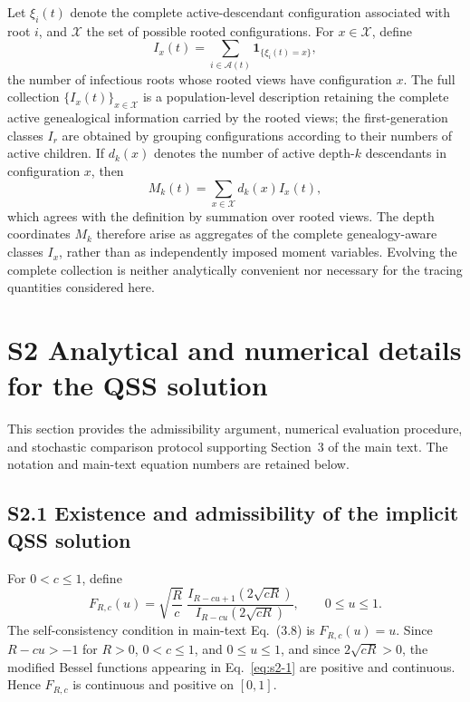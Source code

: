 \documentclass[11pt]{article}
\begin{document}
Let $\xi_i(t)$ denote the complete active-descendant configuration associated with root $i$, and $\mathcal X$ the set of possible rooted configurations. For $x\in\mathcal X$, define
\begin{equation}
I_x(t) = \sum_{i\in\mathcal A(t)} \mathbf 1_{\{\xi_i(t)=x\}},
\end{equation}
the number of infectious roots whose rooted views have configuration $x$. The full collection $\{I_x(t)\}_{x\in\mathcal X}$ is a population-level description retaining the complete active genealogical information carried by the rooted views; the first-generation classes $I_r$ are obtained by grouping configurations according to their numbers of active children. If $d_k(x)$ denotes the number of active depth-$k$ descendants in configuration $x$, then
\begin{equation}
M_k(t) = \sum_{x\in\mathcal X} d_k(x) I_x(t),
\end{equation}
which agrees with the definition by summation over rooted views. The depth coordinates $M_k$ therefore arise as aggregates of the complete genealogy-aware classes $I_x$, rather than as independently imposed moment variables. Evolving the complete collection is neither analytically convenient nor necessary for the tracing quantities considered here.

\section*{S2 Analytical and numerical details for the QSS solution}
This section provides the admissibility argument, numerical evaluation procedure, and stochastic comparison protocol supporting Section~3 of the main text. The notation and main-text equation numbers are retained below.

\subsection*{S2.1 Existence and admissibility of the implicit QSS solution}

For $0<c\leq1$, define
\begin{equation}
F_{R,c}(u)=\sqrt{\frac{R}{c}}\;\frac{I_{R-cu+1}\!\left(2\sqrt{cR}\right)}{I_{R-cu}\!\left(2\sqrt{cR}\right)},
\qquad 0\leq u\leq1.
\label{eq:s2-1}
\end{equation}
The self-consistency condition in main-text Eq.~(3.8) is $F_{R,c}(u)=u$. Since $R-cu>-1$ for $R>0$, $0<c\leq1$, and $0\leq u\leq1$, and since $2\sqrt{cR}>0$, the modified Bessel functions appearing in Eq.~\eqref{eq:s2-1} are positive and continuous. Hence $F_{R,c}$ is continuous and positive on $[0,1]$.
\end{document}
